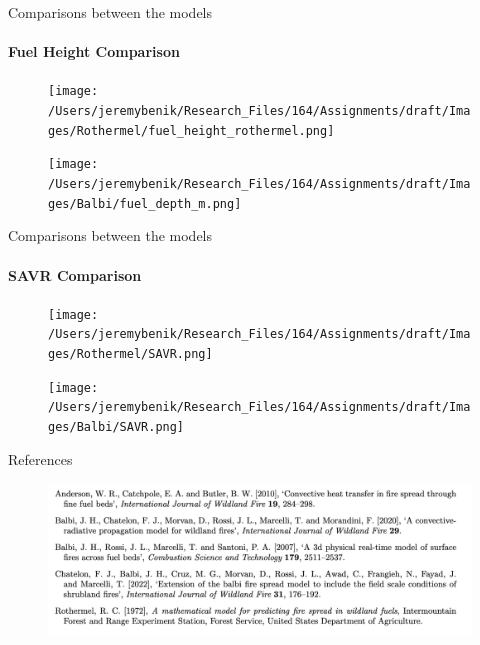 \documentclass{beamer}
\begin{document}
\begin{frame} {Comparisons between the models}
\framesubtitle{Fuel Height Comparison}
\begin{figure}
\centering
\begin{minipage}{.5\textwidth}
  \centering
  \texttt{[image: /Users/jeremybenik/Research\_Files/164/Assignments/draft/Images/Rothermel/fuel\_height\_rothermel.png]}
  \label{fig:test1}
\end{minipage}%
\begin{minipage}{.5\textwidth}
  \centering
  \texttt{[image: /Users/jeremybenik/Research\_Files/164/Assignments/draft/Images/Balbi/fuel\_depth\_m.png]}
  \label{fig:test2}
\end{minipage}
\end{figure}
\end{frame}

\begin{frame} {Comparisons between the models}
\framesubtitle{SAVR Comparison}
\begin{figure}
\centering
\begin{minipage}{.5\textwidth}
  \centering
  \texttt{[image: /Users/jeremybenik/Research\_Files/164/Assignments/draft/Images/Rothermel/SAVR.png]}
  \label{fig:test1}
\end{minipage}%
\begin{minipage}{.5\textwidth}
  \centering
  \texttt{[image: /Users/jeremybenik/Research\_Files/164/Assignments/draft/Images/Balbi/SAVR.png]}
  \label{fig:test2}
\end{minipage}
\end{figure}
\end{frame}


\begin{frame} {References}
\begin{figure}[h]
\centering
  \includegraphics[scale = 0.4]{bib.png}
  \end{figure}
\end{frame}
\end{document}
